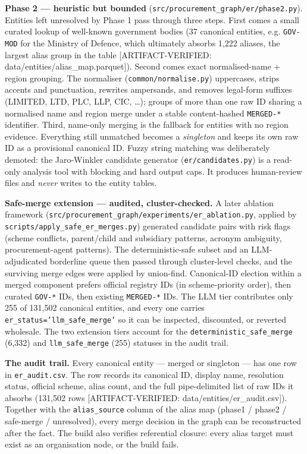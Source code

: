\documentclass[10pt]{article} %
\begin{document}
\textbf{Phase 2 --- heuristic but bounded} (\texttt{src/procurement\_graph/er/phase2.py}). Entities left unresolved by Phase 1 pass through three steps. First comes a small curated lookup of well-known government bodies (37 canonical entities, e.g. \texttt{GOV-MOD} for the Ministry of Defence, which ultimately absorbs 1,222 aliases, the largest alias group in the table [ARTIFACT-VERIFIED: data/entities/alias\_map.parquet]). Second comes exact normalised-name + region grouping. The normaliser (\texttt{common/normalise.py}) uppercases, strips accents and punctuation, rewrites ampersands, and removes legal-form suffixes (LIMITED, LTD, PLC, LLP, CIC, \ldots{}); groups of more than one raw ID sharing a normalised name and region merge under a stable content-hashed \texttt{MERGED-*} identifier. Third, name-only merging is the fallback for entities with no region evidence. Everything still unmatched becomes a \emph{singleton} and keeps its own raw ID as a provisional canonical ID. Fuzzy string matching was deliberately demoted: the Jaro-Winkler candidate generator (\texttt{er/candidates.py}) is a read-only analysis tool with blocking and hard output caps. It produces human-review files and \emph{never} writes to the entity tables.

\textbf{Safe-merge extension --- audited, cluster-checked.} A later ablation framework (\texttt{src/procurement\_graph/experiments/er\_ablation.py}, applied by \texttt{scripts/apply\_safe\_er\_merges.py}) generated candidate pairs with risk flags (scheme conflicts, parent/child and subsidiary patterns, acronym ambiguity, procurement-agent patterns). The deterministic-safe subset and an LLM-adjudicated borderline queue then passed through cluster-level checks, and the surviving merge edges were applied by union-find. Canonical-ID election within a merged component prefers official registry IDs (in scheme-priority order), then curated \texttt{GOV-*} IDs, then existing \texttt{MERGED-*} IDs. The LLM tier contributes only 255 of 131,502 canonical entities, and every one carries \texttt{er\_status='llm\_safe\_merge'} so it can be inspected, discounted, or reverted wholesale. The two extension tiers account for the \texttt{deterministic\_safe\_merge} (6,332) and \texttt{llm\_safe\_merge} (255) statuses in the audit trail.

\textbf{The audit trail.} Every canonical entity --- merged or singleton --- has one row in \texttt{er\_audit.csv}. The row records its canonical ID, display name, resolution status, official scheme, alias count, and the full pipe-delimited list of raw IDs it absorbs (131,502 rows [ARTIFACT-VERIFIED: data/entities/er\_audit.csv]). Together with the \texttt{alias\_source} column of the alias map (phase1 / phase2 / safe-merge / unresolved), every merge decision in the graph can be reconstructed after the fact. The build also verifies referential closure: every alias target must exist as an organisation node, or the build fails.
\end{document}
